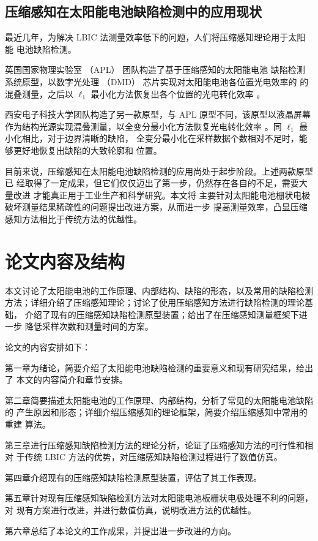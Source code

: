 \subsection{压缩感知在太阳能电池缺陷检测中的应用现状}

最近几年，为解决 LBIC 法测量效率低下的问题，人们将压缩感知理论用于太阳能
电池缺陷检测。

英国国家物理实验室 （APL） 团队构造了基于压缩感知的太阳能电池
缺陷检测系统原型，以数字光处理 （DMD） 芯片实现对太阳能电池各位置光电效率的
的混叠测量，之后以 $\ell_1$ 最小化方法恢复出各个位置的光电转化效率
\cite{CLBIC16} \cite{CLBIC17} 。

西安电子科技大学团队构造了另一款原型，与 APL 原型不同，该原型以液晶屏幕
作为结构光源实现混叠测量，以全变分最小化方法恢复光电转化效率
\cite{XDUCLBIC}。同 $\ell_1$ 最小化相比，对于边界清晰的缺陷，
全变分最小化在采样数据个数相对不足时，能够更好地恢复出缺陷的大致轮廓和
位置。

目前来说，压缩感知在太阳能电池缺陷检测的应用尚处于起步阶段。上述两款原型已
经取得了一定成果，但它们仅仅迈出了第一步，仍然存在各自的不足，需要大量改进
才能真正用于工业生产和科学研究。本文将
主要针对太阳能电池栅状电极破坏测量结果稀疏性的问题提出改进方案，从而进一步
提高测量效率，凸显压缩感知方法相比于传统方法的优越性。

\section{论文内容及结构}

本文讨论了太阳能电池的工作原理、内部结构、缺陷的形态，以及常用的缺陷检测
方法；详细介绍了压缩感知理论；讨论了使用压缩感知方法进行缺陷检测的理论基础，
介绍了现有的压缩感知缺陷检测原型装置；给出了在压缩感知测量框架下进一步
降低采样次数和测量时间的方案。

论文的内容安排如下：

第一章为绪论，简要介绍了太阳能电池缺陷检测的重要意义和现有研究结果，给出了
本文的内容简介和章节安排。

第二章简要描述太阳能电池的工作原理、内部结构，分析了常见的太阳能电池缺陷的
产生原因和形态；详细介绍压缩感知的理论框架，简要介绍压缩感知中常用的重建
算法。

第三章进行压缩感知缺陷检测方法的理论分析，论证了压缩感知方法的可行性和相对
于传统 LBIC 方法的优势，对压缩感知缺陷检测过程进行了数值仿真。

第四章介绍现有的压缩感知缺陷检测原型装置，评估了其工作表现。

第五章针对现有压缩感知缺陷检测方法对太阳能电池板栅状电极处理不利的问题，对
现有方案进行改进，并进行数值仿真，说明改进方法的优越性。

第六章总结了本论文的工作成果，并提出进一步改进的方向。
